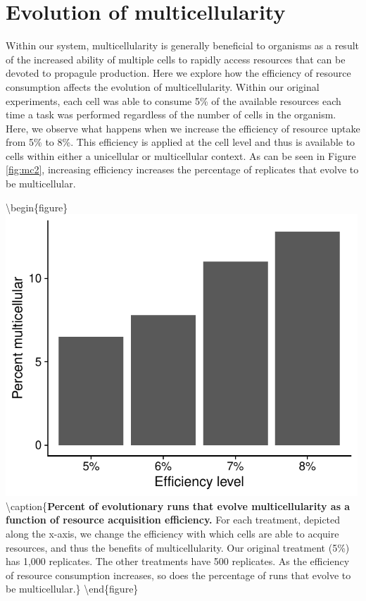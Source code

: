 \documentclass[
]{book}
\begin{document}
\hypertarget{evolution-of-multicellularity}{%
\chapter{Evolution of multicellularity}\label{evolution-of-multicellularity}}

Within our system, multicellularity is generally beneficial to organisms as a result of the increased ability of multiple cells to rapidly access resources that can be devoted to propagule production. Here we explore how the efficiency of resource consumption affects the evolution of multicellularity. Within our original experiments, each cell was able to consume 5\% of the available resources each time a task was performed regardless of the number of cells in the organism. Here, we observe what happens when we increase the efficiency of resource uptake from 5\% to 8\%. This efficiency is applied at the cell level and thus is available to cells within either a unicellular or multicellular context. As can be seen in Figure \ref{fig:mc2}, increasing efficiency increases the percentage of replicates that evolve to be multicellular.

\textbackslash begin\{figure\}
\includegraphics[width=500px]{images/Figure_S1_Percent_multicellular_by_efficiency_level} \textbackslash caption\{\textbf{Percent of evolutionary runs that evolve multicellularity as a function of resource acquisition efficiency.} For each treatment, depicted along the x-axis, we change the efficiency with which cells are able to acquire resources, and thus the benefits of multicellularity. Our original treatment (5\%) has 1,000 replicates. The other treatments have 500 replicates. As the efficiency of resource consumption increases, so does the percentage of runs that evolve to be multicellular.\}\label{fig:mc2}
\textbackslash end\{figure\}
\end{document}
